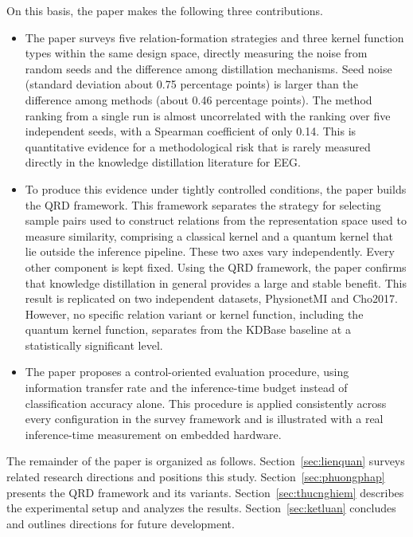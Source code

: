 On this basis, the paper makes the following three contributions.

\begin{itemize}
\item The paper surveys five relation-formation strategies and three
kernel function types within the same design space, directly
measuring the noise from random seeds and the difference among
distillation mechanisms. Seed noise (standard deviation about 0.75
percentage points) is larger than the difference among methods (about
0.46 percentage points). The method ranking from a single run is
almost uncorrelated with the ranking over five independent seeds,
with a Spearman coefficient of only 0.14. This is quantitative
evidence for a methodological risk that is rarely measured directly
in the knowledge distillation literature for EEG.

\item To produce this evidence under tightly controlled conditions,
the paper builds the QRD framework. This framework separates the
strategy for selecting sample pairs used to construct relations from
the representation space used to measure similarity, comprising a
classical kernel and a quantum kernel that lie outside the inference
pipeline. These two axes vary independently. Every other component is
kept fixed. Using the QRD framework, the paper confirms that
knowledge distillation in general provides a large and stable
benefit. This result is replicated on two independent datasets,
PhysionetMI and Cho2017. However, no specific relation variant or
kernel function, including the quantum kernel function, separates
from the KDBase baseline at a statistically significant level.

\item The paper proposes a control-oriented evaluation procedure,
using information transfer rate and the inference-time budget instead
of classification accuracy alone. This procedure is applied
consistently across every configuration in the survey framework and
is illustrated with a real inference-time measurement on embedded
hardware.
\end{itemize}

The remainder of the paper is organized as follows.
Section~\ref{sec:lienquan} surveys related research directions and
positions this study. Section~\ref{sec:phuongphap} presents the QRD
framework and its variants. Section~\ref{sec:thucnghiem} describes
the experimental setup and analyzes the results.
Section~\ref{sec:ketluan} concludes and outlines directions for
future development.

